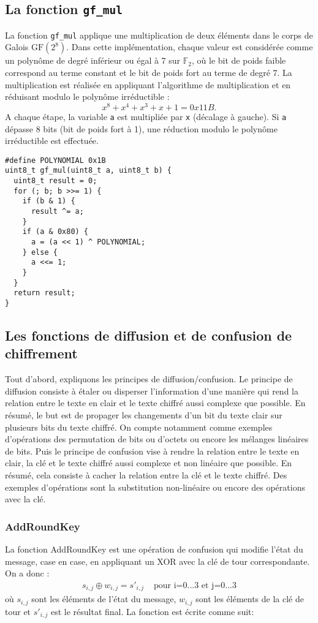 \documentclass[a4paper, 10pt]{article}
\begin{document}
  \subsection{La fonction \texttt{gf_mul}}
  \normalsize
  La fonction \texttt{gf_mul} applique une multiplication de deux éléments dans le corps 
  de Galois \( \text{GF}(2^8) \). Dans cette implémentation, chaque valeur est 
  considérée comme un polynôme de degré inférieur ou égal à 7 sur \( \mathbb{F}_2\), 
  où le bit de poids faible correspond au terme constant et le bit de poids fort 
  au terme de degré 7. La multiplication est réalisée en appliquant l'algorithme de 
  multiplication et en réduisant modulo le polynôme irréductible :
  \[ x^8 + x^4 + x^3 + x + 1 = 0x11B. \]
  A chaque étape, la variable \texttt{a} est multipliée par \texttt{x} (décalage à gauche). 
  Si \texttt{a} dépasse 8 bits (bit de poids fort à 1), une réduction modulo le 
  polynôme irréductible est effectuée. 

  \small{
    \begin{verbatim}
#define POLYNOMIAL 0x1B
uint8_t gf_mul(uint8_t a, uint8_t b) {
  uint8_t result = 0;
  for (; b; b >>= 1) {
    if (b & 1) {
      result ^= a;
    }
    if (a & 0x80) {
      a = (a << 1) ^ POLYNOMIAL;
    } else {
      a <<= 1;
    }
  }
  return result;
}
    \end{verbatim}
  }

  \subsection{Les fonctions de diffusion et de confusion de chiffrement}
  \normalsize
  Tout d'abord, expliquons les principes de diffusion/confusion. Le principe de diffusion consiste 
  à étaler ou disperser l'information d'une manière qui rend la relation entre le texte en clair 
  et le texte chiffré aussi complexe que possible. En résumé, le but est de propager les changements d'un bit du texte clair sur 
  plusieurs bits du texte chiffré. On compte notamment comme exemples d'opérations des permutation de bits ou d'octets ou encore 
  les mélanges linéaires de bits.
  Puis le principe de confusion vise à rendre la relation entre le texte en clair, la clé et le 
  texte chiffré aussi complexe et non linéaire que possible. En résumé, cela consiste à cacher la relation entre la clé et le texte 
  chiffré. Des exemples d'opérations sont la substitution non-linéaire ou encore des opérations avec la clé.
  \subsubsection{AddRoundKey}
  La fonction AddRoundKey est une opération de confusion qui modifie l'état du message, 
  case en case, en appliquant un XOR avec la clé de tour correspondante. On a donc : 
  \begin{align*}
    s_{i,j} \oplus w_{i,j} = s'_{i,j} & \text{  pour i=0...3 et j=0...3}
  \end{align*}
  où \(s_{i,j}\) sont les éléments de l'état du message, 
  \(w_{i,j}\) sont les éléments de la clé de tour et  
  \(s'_{i,j}\) est le résultat final. 
  La fonction est écrite comme suit:
\end{document}
